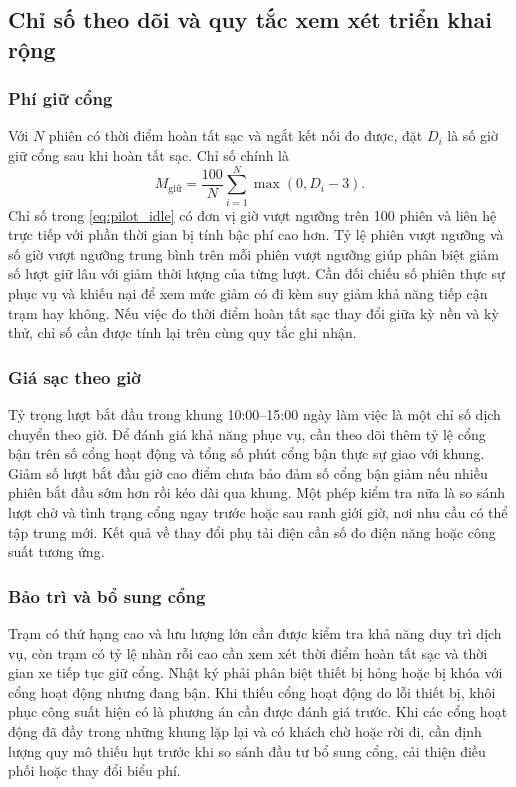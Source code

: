 \documentclass[conference,a4paper]{IEEEtran}
\begin{document}
\subsection{Chỉ số theo dõi và quy tắc xem xét triển khai rộng}

\subsubsection{Phí giữ cổng}
Với $N$ phiên có thời điểm hoàn tất sạc và ngắt kết nối đo được, đặt $D_i$ là số giờ giữ cổng sau khi hoàn tất sạc. Chỉ số chính là
\begin{equation}
M_{\text{giữ}}=\frac{100}{N}\sum_{i=1}^{N}\max(0,D_i-3).
\label{eq:pilot_idle}
\end{equation}
Chỉ số trong \eqref{eq:pilot_idle} có đơn vị giờ vượt ngưỡng trên 100 phiên và liên hệ trực tiếp với phần thời gian bị tính bậc phí cao hơn. Tỷ lệ phiên vượt ngưỡng và số giờ vượt ngưỡng trung bình trên mỗi phiên vượt ngưỡng giúp phân biệt giảm số lượt giữ lâu với giảm thời lượng của từng lượt. Cần đối chiếu số phiên thực sự phục vụ và khiếu nại để xem mức giảm có đi kèm suy giảm khả năng tiếp cận trạm hay không. Nếu việc đo thời điểm hoàn tất sạc thay đổi giữa kỳ nền và kỳ thử, chỉ số cần được tính lại trên cùng quy tắc ghi nhận.

\subsubsection{Giá sạc theo giờ}
Tỷ trọng lượt bắt đầu trong khung 10:00--15:00 ngày làm việc là một chỉ số dịch chuyển theo giờ. Để đánh giá khả năng phục vụ, cần theo dõi thêm tỷ lệ cổng bận trên số cổng hoạt động và tổng số phút cổng bận thực sự giao với khung. Giảm số lượt bắt đầu giờ cao điểm chưa bảo đảm số cổng bận giảm nếu nhiều phiên bắt đầu sớm hơn rồi kéo dài qua khung. Một phép kiểm tra nữa là so sánh lượt chờ và tình trạng cổng ngay trước hoặc sau ranh giới giờ, nơi nhu cầu có thể tập trung mới. Kết quả về thay đổi phụ tải điện cần số đo điện năng hoặc công suất tương ứng.

\subsubsection{Bảo trì và bổ sung cổng}
Trạm có thứ hạng cao và lưu lượng lớn cần được kiểm tra khả năng duy trì dịch vụ, còn trạm có tỷ lệ nhàn rỗi cao cần xem xét thời điểm hoàn tất sạc và thời gian xe tiếp tục giữ cổng. Nhật ký phải phân biệt thiết bị hỏng hoặc bị khóa với cổng hoạt động nhưng đang bận. Khi thiếu cổng hoạt động do lỗi thiết bị, khôi phục công suất hiện có là phương án cần được đánh giá trước. Khi các cổng hoạt động đã đầy trong những khung lặp lại và có khách chờ hoặc rời đi, cần định lượng quy mô thiếu hụt trước khi so sánh đầu tư bổ sung cổng, cải thiện điều phối hoặc thay đổi biểu phí.
\end{document}
